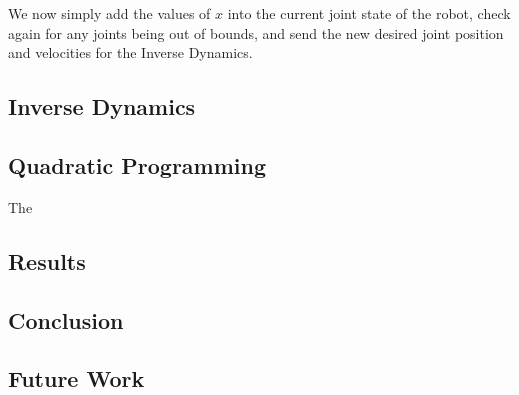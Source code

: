 \documentclass[12pt]{report}
\begin{document}
We now simply add the values of $x$ into the current joint state of the robot, check again for any joints being out of bounds, and send the new desired joint position and velocities for the Inverse Dynamics.

\subsection{Inverse Dynamics}



\subsection{Quadratic Programming}



The 

\subsection{Results}

\subsection{Conclusion}

\subsection{Future Work}
\end{document}
